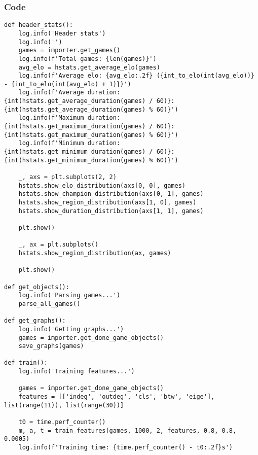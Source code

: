 \documentclass{beamer}
\begin{document}
\begin{frame}[fragile]
    \frametitle{Code}
    \fontsize{3pt}{5pt}\selectfont
    \begin{verbatim}
def header_stats():
    log.info('Header stats')
    log.info('')
    games = importer.get_games()
    log.info(f'Total games: {len(games)}')
    avg_elo = hstats.get_average_elo(games)
    log.info(f'Average elo: {avg_elo:.2f} ({int_to_elo(int(avg_elo))} - {int_to_elo(int(avg_elo) + 1)})')
    log.info(f'Average duration: {int(hstats.get_average_duration(games) / 60)}:{int(hstats.get_average_duration(games) % 60)}')
    log.info(f'Maximum duration: {int(hstats.get_maximum_duration(games) / 60)}:{int(hstats.get_maximum_duration(games) % 60)}')
    log.info(f'Minimum duration: {int(hstats.get_minimum_duration(games) / 60)}:{int(hstats.get_minimum_duration(games) % 60)}')

    _, axs = plt.subplots(2, 2)
    hstats.show_elo_distribution(axs[0, 0], games)
    hstats.show_champion_distribution(axs[0, 1], games)
    hstats.show_region_distribution(axs[1, 0], games)
    hstats.show_duration_distribution(axs[1, 1], games)

    plt.show()

    _, ax = plt.subplots()
    hstats.show_region_distribution(ax, games)

    plt.show()

def get_objects():
    log.info('Parsing games...')
    parse_all_games()

def get_graphs():
    log.info('Getting graphs...')
    games = importer.get_done_game_objects()
    save_graphs(games)

def train():
    log.info('Training features...')

    games = importer.get_done_game_objects()
    features = [['indeg', 'outdeg', 'cls', 'btw', 'eige'], list(range(11)), list(range(30))]

    t0 = time.perf_counter()
    m, a, t = train_features(games, 1000, 2, features, 0.8, 0.8, 0.0005)
    log.info(f'Training time: {time.perf_counter() - t0:.2f}s')
    \end{verbatim}
\end{frame}
\end{document}
